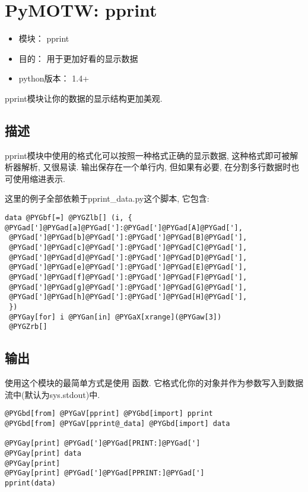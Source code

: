 \documentclass[a4paper,10pt,english]{manual}
\begin{document}
\resetcurrentobjects


\chapter{PyMOTW: pprint}
\begin{itemize}
\item {} 
模块： pprint

\item {} 
目的： 用于更加好看的显示数据

\item {} 
python版本： 1.4+

\end{itemize}

pprint模块让你的数据的显示结构更加美观.


\section{描述}

pprint模块中使用的格式化可以按照一种格式正确的显示数据, 这种格式即可被解析器解析, 又很易读. 输出保存在一个单行内, 但如果有必要, 在分割多行数据时也可使用缩进表示.

这里的例子全部依赖于pprint\_data.py这个脚本, 它包含:

\begin{Verbatim}[commandchars=@\[\]]
data @PYGbf[=] @PYGZlb[] (i, { @PYGad[']@PYGad[a]@PYGad[']:@PYGad[']@PYGad[A]@PYGad['],
 @PYGad[']@PYGad[b]@PYGad[']:@PYGad[']@PYGad[B]@PYGad['],
 @PYGad[']@PYGad[c]@PYGad[']:@PYGad[']@PYGad[C]@PYGad['],
 @PYGad[']@PYGad[d]@PYGad[']:@PYGad[']@PYGad[D]@PYGad['],
 @PYGad[']@PYGad[e]@PYGad[']:@PYGad[']@PYGad[E]@PYGad['],
 @PYGad[']@PYGad[f]@PYGad[']:@PYGad[']@PYGad[F]@PYGad['],
 @PYGad[']@PYGad[g]@PYGad[']:@PYGad[']@PYGad[G]@PYGad['],
 @PYGad[']@PYGad[h]@PYGad[']:@PYGad[']@PYGad[H]@PYGad['],
 })
 @PYGay[for] i @PYGan[in] @PYGaX[xrange](@PYGaw[3])
 @PYGZrb[]
\end{Verbatim}


\section{输出}

使用这个模块的最简单方式是使用  函数. 它格式化你的对象并作为参数写入到数据流中(默认为sys.stdout)中.

\begin{Verbatim}[commandchars=@\[\]]
@PYGbd[from] @PYGaV[pprint] @PYGbd[import] pprint
@PYGbd[from] @PYGaV[pprint@_data] @PYGbd[import] data

@PYGay[print] @PYGad[']@PYGad[PRINT:]@PYGad[']
@PYGay[print] data
@PYGay[print]
@PYGay[print] @PYGad[']@PYGad[PPRINT:]@PYGad[']
pprint(data)
\end{Verbatim}
\end{document}
